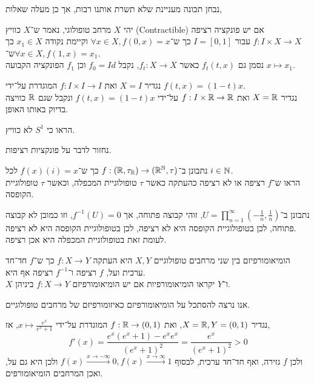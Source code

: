 נבחן תכונה מעניינת שלא תשרת אותנו רבות, אך כן מעלה שאלות,
\begin{definition}\label{definition:contractable_space}
	יהי $X$ מרחב טופולוגי, נאמר ש־$X$ כוויץ (Contractible) אם יש פונקציה רציפה $f : I \times X \to X$ עבור $I = [0, 1]$ כך ש־$\forall x \in X, f(0, x) = x$ וקיימת נקודה $x_1 \in X$ כך ש־$\forall x \in X, f(1, x) = x_1$. \\
	נסמן גם $f_t(t, x)$ כאשר $f_t : X \to X$, נקבל $f_0 = Id$ וכן $f_1$ הפונקציה הקבועה $x \mapsto x_1$.
\end{definition}
\begin{example}
	נגדיר $X = I$ ואת $f : I \times I \to I$ המוגדרת על־ידי $f(t, x) = (1 - t)x$. \\
	נגדיר $X = \mathbb{R}$ ואת $f : I \times \mathbb{R} \to \mathbb{R}$ על־ידי $f(t, x) = (1 - t)x$ ונקבל שגם $\mathbb{R}$ כוויצה בדיוק באותו האופן.
\end{example}
\begin{exercise}
	הראו כי $S^1$ לא כוויץ.
\end{exercise}
נחזור לדבר על פונקציות רציפות.
\begin{exercise}
	נתבונן ב־$f : (\mathbb{R}, \tau_{\mathbb{R}}) \to (\mathbb{R}^{\mathbb{N}}, \tau)$ כך ש־$f(x)(i) = x$ לכל $i \in \mathbb{N}$. \\
	הראו ש־$f$ רציפה או לא רציפה כהעתקה כאשר $\tau$ טופולוגיית המכפלה, וכאשר $\tau$ טופולוגיית הקופסה.
\end{exercise}
\begin{solution}
	נתבונן ב־$U = \prod_{n = 1}^\infty (-\frac{1}{n}, \frac{1}{n})$, זוהי קבוצה פתוחה, אך $f^{-1}(U) = 0$, וזו כמובן לא קבוצה פתוחה, לכן בטופולוגיית הקופסה היא לא רציפה, לכן בטופולוגיית הקופסה היא לא רציפה. \\
	לעומת זאת בטופולוגיית המכפלה היא אכן רציפה.
\end{solution}
\begin{definition}[הומיאומורפיזם]
	הומיאומורפיזם בין שני מרחבים טופולוגיים $X, Y$ היא העתקה $f : X \to Y$ כך ש־$f$ חד־חד ערכית ועל, $f$ רציפה ו־$f^{-1}$ רציפה אף היא. \\
	$X$ ו־$Y$ יקראו הומיאומורפיות אם יש הומיאומורפיזם $f : X \to Y$ ביניהן.
\end{definition}
אנו נרצה להסתכל על הומיאומורפיזם כאיזומורפיזם של מרחבים טופולוגיים.
\begin{example}
	נגדיר $X = \mathbb{R}, Y = (0, 1)$, ואת $f : \mathbb{R} \to (0, 1)$ המוגדרת על־ידי $x \mapsto \frac{e^x}{e^x + 1}$, אז,
	\[
		f'(x)
		= \frac{e^x(e^x + 1) - e^x e^x}{{(e^x + 1)}^2}
		= \frac{e^x}{{(e^x + 1)}^2}
		> 0
	\]
	ולכן $f$ גזירה, ואף חד־חד ערכית, לבסוף $f(x) \xrightarrow{x \to -\infty} 0, f(x) \xrightarrow{x \to \infty} 1$ ולכן היא גם על, ואכן המרחבים הומיאומורפים.
\end{example}
